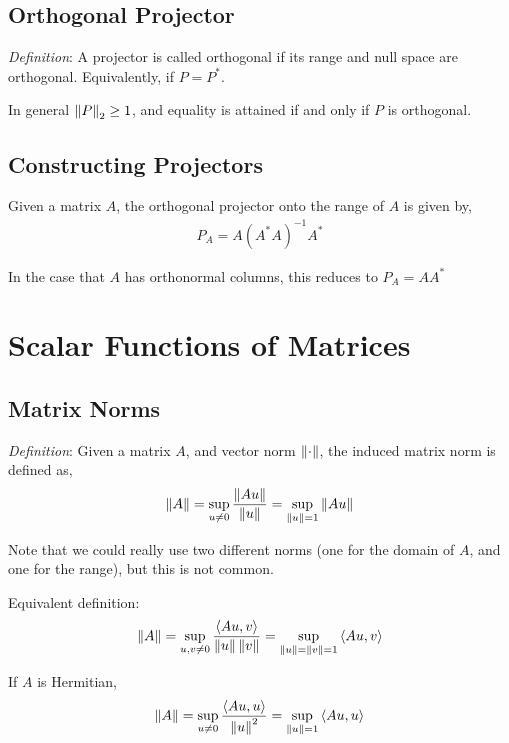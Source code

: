 \documentclass[12pt]{article}
\begin{document}
\subsection{Orthogonal Projector}
\textit{Definition}: A projector is called orthogonal if its range and null space are orthogonal. Equivalently, if \( P = P^* \).

In general \( \left\lVert P\right\rVert_2 \geq 1 \), and equality is attained if and only if \( P \) is orthogonal.

\subsection{Constructing Projectors}
Given a matrix \( A \), the orthogonal projector onto the range of \( A \) is given by,
\begin{align*}
    P_A = A(A^*A)^{-1}A^*
\end{align*}

In the case that \( A \) has orthonormal columns, this reduces to \( P_A = AA^* \)




\pagebreak

\section{Scalar Functions of Matrices}

\subsection{Matrix Norms}
\textit{Definition}: Given a matrix \( A \), and vector norm \( \left\lVert\cdot\right\rVert \), the induced matrix norm is defined as,
\begin{align*}
    \left\lVert A\right\rVert = \sup_{u\neq 0} \frac{\left\lVert Au\right\rVert}{\left\lVert u\right\rVert} = \sup_{\left\lVert u\right\rVert=1} \left\lVert Au\right\rVert
\end{align*}

Note that we could really use two different norms (one for the domain of \( A \), and one for the range), but this is not common.

Equivalent definition:
\begin{align*}
    \left\lVert A\right\rVert = \sup_{u,v\neq 0} \frac{\left\langle Au,v \right\rangle}{\left\lVert u\right\rVert\left\lVert v\right\rVert} = \sup_{\left\lVert u\right\rVert=\left\lVert v\right\rVert=1} \left\langle Au,v \right\rangle
\end{align*}
 
If \( A \) is Hermitian,
\begin{align*}
    \left\lVert A\right\rVert = \sup_{u\neq 0} \frac{\left\langle Au,u \right\rangle}{\left\lVert u\right\rVert^2} = \sup_{\left\lVert u\right\rVert=1} \left\langle Au,u \right\rangle
\end{align*}
\end{document}
